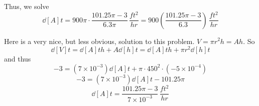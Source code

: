 \documentclass[handout,nooutcomes]{ximera}
\begin{document}
\begin{problem}
\begin{freeResponse}
		Thus, we solve
		$$ \dd[A]{t} = 900 \pi \cdot \frac{101.25 \pi - 3}{6.3 \pi} \, \frac{ft^2}{hr} = 900 \left( \frac{101.25 \pi - 3}{6.3} \right) \, \frac{ft^2}{hr} $$
		
		
		Here is a very nice, but less obvious, solution to this problem.
		$V = \pi r^2 h = Ah$.  So 
		$$ \dd[V]{t} = \dd[A]{t} h + A \dd[h]{t} = \dd[A]{t} h + \pi r^2 \dd[h]{t}$$
		and thus
		$$ -3 = (7 \times 10^{-3}) \dd[A]{t} + \pi \cdot 450^2 \cdot (-5 \times 10^{-4}) $$
		$$ -3 = (7 \times 10^{-3}) \dd[A]{t} - 101.25 \pi  $$
		$$ \dd[A]{t} = \frac{101.25 \pi - 3}{7 \times 10^{-3}} \, \frac{ft^2}{hr} $$

		\end{freeResponse}
		
		
\end{problem}







\newpage
\end{document}
